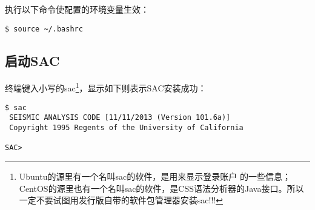 执行以下命令使配置的环境变量生效：
\begin{lstlisting}[style=Shell]
$ source ~/.bashrc
\end{lstlisting}

\subsection*{启动SAC}
终端键入小写的sac\footnote{Ubuntu的源里有一个名叫sac的软件，是用来显示登录账户
的一些信息；CentOS的源里也有一个名叫sac的软件，是CSS语法分析器的Java接口。所以
一定不要试图用发行版自带的软件包管理器安装sac!!!}，显示如下则表示SAC安装成功：
\begin{lstlisting}[style=Shell]
$ sac
 SEISMIC ANALYSIS CODE [11/11/2013 (Version 101.6a)]
 Copyright 1995 Regents of the University of California

SAC>
\end{lstlisting}
